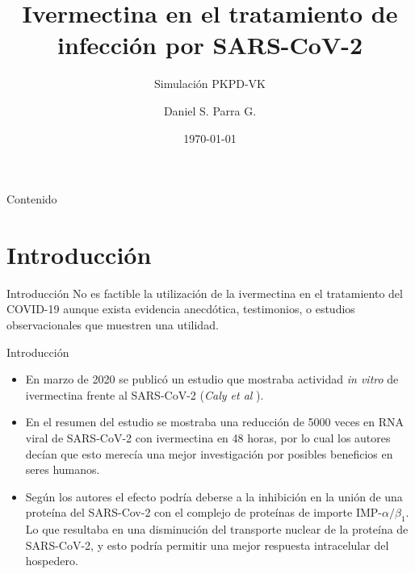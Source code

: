 \documentclass[12pt]{beamer}
\begin{document}
	\author[Daniel Parra]{Daniel S. Parra G.}
	\title[IVM en el tratamiento de infección]{Ivermectina en el tratamiento de infección por SARS-CoV-2}
	\subtitle{Simulación PKPD-VK}
	\date{\today}
	\begin{frame}[plain]
		\maketitle
	\end{frame}
	
	\begin{frame}{Contenido}
		\tableofcontents[currentsection]
	\end{frame}
	
	\section{Introducción}
	\begin{frame}{Introducción}
		No es factible la utilización de la ivermectina en el tratamiento del COVID-19 aunque exista evidencia anecdótica, testimonios, o estudios observacionales que muestren una utilidad.
	\end{frame}
	
	\begin{frame}{Introducción}
		\begin{itemize}
			\small\setlength\itemsep{1.5em}
			\item En marzo de 2020 se publicó un estudio que mostraba actividad \textit{in vitro} de ivermectina frente al SARS-CoV-2 (\textit{Caly et al} \cite{Caly2020}). \\
			
			\item  En el resumen del estudio se mostraba una reducción de 5000 veces en RNA viral de SARS-CoV-2 con ivermectina en 48 horas, por lo cual los autores decían que esto merecía una mejor investigación por posibles beneficios en seres humanos. \\
			
			\item Según los autores el efecto podría deberse a la inhibición en la unión de una proteína del SARS-Cov-2 con el complejo de proteínas de importe $\mathrm{IMP}\text{-}\alpha/\beta_{1}$. Lo que resultaba en una disminución del transporte nuclear de la proteína de SARS-CoV-2, y esto podría permitir una mejor respuesta intracelular del hospedero. 
		\end{itemize}
	\end{frame}
\end{document}
